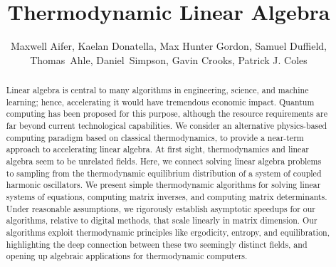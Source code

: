 \documentclass[prx,onecolumn,floatfix,longbibliography,notitlepage, nofootinbib,12pt]{revtex4-2}
\begin{document}
\title{Thermodynamic Linear Algebra}
\author{Maxwell Aifer, Kaelan Donatella, Max Hunter Gordon, Samuel Duffield, Thomas~Ahle, Daniel~Simpson, Gavin Crooks, Patrick J. Coles}


\begin{abstract}
Linear algebra is central to many algorithms in engineering, science, and machine learning; hence, accelerating it would have tremendous economic impact. Quantum computing has been proposed for this purpose, although the resource requirements are far beyond current technological capabilities. We consider an alternative physics-based computing paradigm based on classical thermodynamics, to provide a near-term approach to accelerating linear algebra. At first sight, thermodynamics and linear algebra seem to be unrelated fields. Here, we connect solving linear algebra problems to sampling from the thermodynamic equilibrium distribution of a system of coupled harmonic oscillators. We present simple thermodynamic algorithms for solving linear systems of equations, computing matrix inverses, and computing matrix determinants. Under reasonable assumptions, we rigorously establish asymptotic speedups for our algorithms, relative to digital methods, that scale linearly in matrix dimension. Our algorithms exploit thermodynamic principles like ergodicity, entropy, and equilibration, highlighting the deep connection between these two seemingly distinct fields, and opening up algebraic applications for thermodynamic computers.
\end{abstract}

\maketitle
\end{document}
